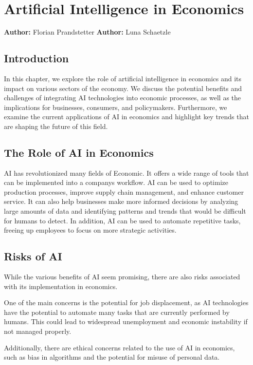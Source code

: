 \chapter{Artificial Intelligence in Economics}
\label{chap:Artificial_Intelligence_in_Economics}
\textbf{Author:} Florian Prandstetter
\textbf{Author:} Luna Schaetzle


\section{Introduction}

In this chapter, we explore the role of artificial intelligence in economics and its impact on various sectors of the economy. We discuss the potential benefits and challenges of integrating AI technologies into economic processes, as well as the implications for businesses, consumers, and policymakers. Furthermore, we examine the current applications of AI in economics and highlight key trends that are shaping the future of this field.


\section{The Role of AI in Economics}

AI has revolutionized many fields of Economic. It offers a wide range of tools that can be implemented into a companys workflow.
AI can be used to optimize production processes, improve supply chain management, and enhance customer service. It can also help businesses make more informed decisions by analyzing large amounts of data and identifying patterns and trends that would be difficult for humans to detect. In addition, AI can be used to automate repetitive tasks, freeing up employees to focus on more strategic activities.

\section{Risks of AI}
\label{sec:risks-of-ai}

While the various benefits of AI seem promising, there are also risks associated with its implementation in economics.

One of the main concerns is the potential for job displacement, as AI technologies have the potential to automate many tasks that are currently performed by humans. This could lead to widespread unemployment and economic instability if not managed properly. 

Additionally, there are ethical concerns related to the use of AI in economics, such as bias in algorithms and the potential for misuse of personal data.

